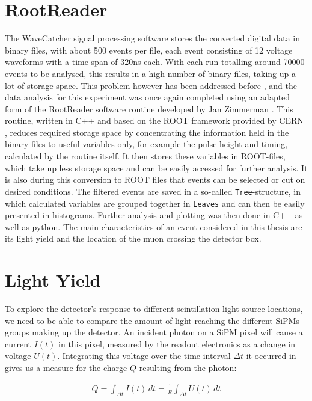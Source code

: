     

\section{RootReader}

	The WaveCatcher signal processing software stores the converted digital data in binary files, with about 500 events per file, each event consisting of 12 voltage waveforms with a time span of 320ns each. With each run totalling around 70000 events to be analysed, this results in a high number of binary files, taking up a lot of storage space. This problem however has been addressed before \cite{HANEL}, and the data analysis for this experiment was once again completed using an adapted form of the RootReader software routine developed by Jan Zimmerman \cite{ROOTREADER}. This routine, written in C++ and based on the ROOT framework provided by CERN \cite{CERN}, reduces required storage space by concentrating the information held in the binary files to useful variables only, for example the pulse height and timing, calculated by the routine itself. It then stores these variables in ROOT-files, which take up less storage space and can be easily accessed for further analysis. It is also during this conversion to ROOT files that events can be selected or cut on desired conditions. The filtered events are saved in a so-called \lstinline|Tree|-structure, in which calculated variables are grouped together in \lstinline|Leaves| and can then be easily presented in histograms. Further analysis and plotting was then done in C++ as well as python. 
    The main characteristics of an event considered in this thesis are its light yield and the location of the muon crossing the detector box.

\section{Light Yield}

    To explore the detector's response to different scintillation light source locations, we need to be able to compare the amount of light reaching the different \acsp{SiPM} groups making up the detector.
	An incident photon on a \ac{SiPM} pixel will cause a current $I(t)$ in this pixel, measured by the readout electronics as a change in voltage $U(t)$. Integrating this voltage over the time interval $\Delta t$ it occurred in gives us a measure for the charge $Q$ resulting from the photon:
	
	\begin{align}
	    Q =  \int_{\Delta t} I(t) \,dt = \frac{1}{R} \int_{\Delta t} U(t) \,dt 
	\end{align}
	
